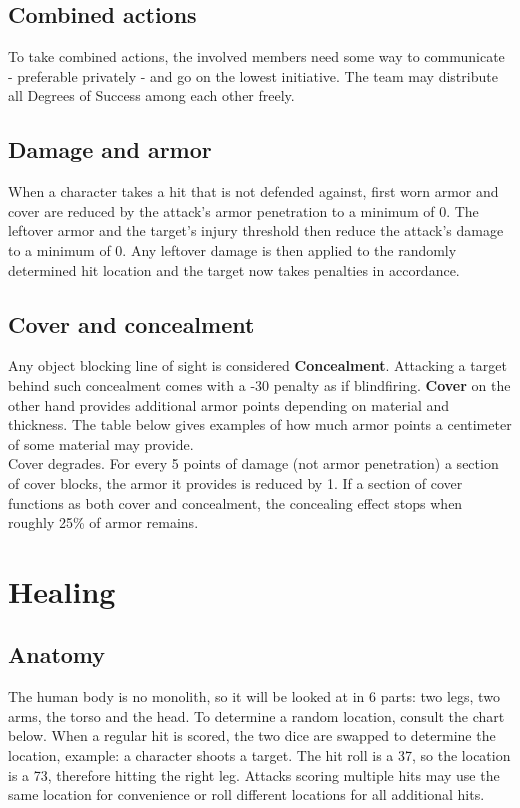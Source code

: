 \documentclass[12pt,a4paper]{book}
\begin{document}
	\section{Combined actions}
	To take combined actions, the involved members need some way to communicate - preferable privately - and go on the lowest initiative. The team may distribute all Degrees of Success among each other freely.
	\section{Damage and armor}
	When a character takes a hit that is not defended against, first worn armor and cover are reduced by the attack's armor penetration to a minimum of 0. The leftover armor and the target’s injury threshold then reduce the attack’s damage to a minimum of 0. Any leftover damage is then applied to the randomly determined hit location and the target now takes penalties in accordance.
	\section{Cover and concealment}
	Any object blocking line of sight is considered \textbf{Concealment}. Attacking a target behind such concealment comes with a -30 penalty as if blindfiring.
	\textbf{Cover} on the other hand provides additional armor points depending on material and thickness. The table below gives examples of how much armor points a centimeter of some material may provide.\\
	Cover degrades. For every 5 points of damage (not armor penetration) a section of cover blocks, the armor it provides is reduced by 1. If a section of cover functions as both cover and concealment, the concealing effect stops when roughly 25\% of armor remains.
	
	\chapter{Healing}
	\section{Anatomy}
	The human body is no monolith, so it will be looked at in 6 parts: two legs, two arms, the torso and the head. To determine a random location, consult the chart below. When a regular hit is scored, the two dice are swapped to determine the location, example: a character shoots a target. The hit roll is a 37, so the location is a 73, therefore hitting the right leg. Attacks scoring multiple hits may use the same location for convenience or roll different locations for all additional hits.
\end{document}
